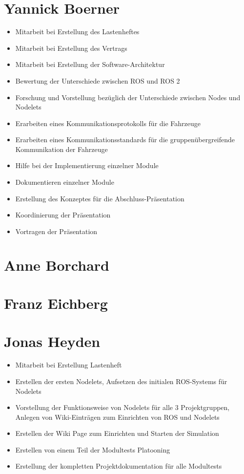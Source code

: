 \documentclass[a4paper, 12pt, titlepage]{scrartcl}
\begin{document}
{	\section{Yannick Boerner} 
	  \begin{itemize}
	    \item Mitarbeit bei Erstellung des Lastenheftes
		\item Mitarbeit bei Erstellung des Vertrags
		\item Mitarbeit bei Erstellung der Software-Architektur
	    \item Bewertung der Unterschiede zwischen ROS und ROS 2
		\item Forschung und Vorstellung bezüglich der Unterschiede zwischen Nodes und Nodelets
	    \item Erarbeiten eines Kommunikationsprotokolls für die Fahrzeuge
		\item Erarbeiten eines Kommunikationsstandards für die gruppenübergreifende Kommunikation der Fahrzeuge
		\item Hilfe bei der Implementierung einzelner Module 
	    \item Dokumentieren einzelner Module
	    \item Erstellung des Konzeptes für die Abschluss-Präsentation 
		\item Koordinierung der Präsentation
		\item Vortragen der Präsentation
	  \end{itemize}
	\section{Anne Borchard}
	\section{Franz Eichberg}
	\section{Jonas Heyden}
	  \begin{itemize}
	    \item Mitarbeit bei Erstellung Lastenheft
	    \item Erstellen der ersten Nodelets, Aufsetzen des initialen ROS-Systems für Nodelets
	    \item Vorstellung der Funktionsweise von Nodelets für alle 3 Projektgruppen, Anlegen von Wiki-Einträgen zum Einrichten von ROS und Nodelets
	    \item Erstellen der Wiki Page zum Einrichten und Starten der Simulation
	    \item Erstellen von einem Teil der Modultests Platooning
	    \item Erstellung der kompletten Projektdokumentation für alle Modultests
	  \end{itemize}
}
\end{document}
